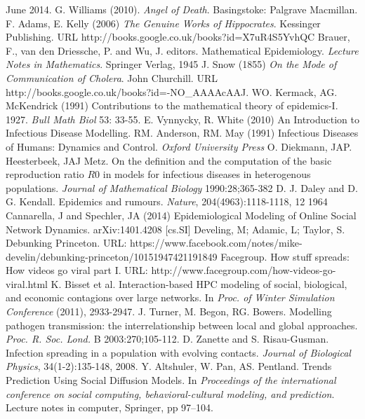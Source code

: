 \documentclass[11pt, a4paper, oneside,titlepage]{article}
\begin{document}
\begin{thebibliography}{1}
          June 2014.
	G. Williams (2010). \emph{Angel of Death}. Basingstoke: Palgrave Macmillan.
	F. Adams, E. Kelly (2006) \emph{The Genuine Works of Hippocrates}. Kessinger Publishing. URL http://books.google.co.uk/books?id=X7uR4S5YvhQC
	 Brauer, F., van den Driessche, P. and Wu, J. editors.  Mathematical Epidemiology. \emph{Lecture Notes in Mathematics}. Springer Verlag, 1945 
	J. Snow (1855) \emph{On the Mode of Communication of Cholera}. John Churchill. URL http://books.google.co.uk/books?id=-NO\_AAAAcAAJ.
	WO. Kermack, AG. McKendrick (1991) Contributions to the mathematical theory of epidemics-I. 1927. \emph{Bull Math Biol} 53: 33-55.
	E. Vynnycky, R. White (2010) An Introduction to Infectious Disease Modelling.
	RM. Anderson, RM. May (1991) Infectious Diseases of Humans: Dynamics and Control. \emph{Oxford University Press}
	O. Diekmann, JAP. Heesterbeek, JAJ Metz. On the definition and the computation of the basic reproduction ratio $R0$ in models for infectious diseases in heterogenous populations. \emph{Journal of Mathematical Biology} 1990:28;365-382
	D. J. Daley and D. G. Kendall. Epidemics and rumours. \emph{Nature}, 204(4963):1118-1118, 12 1964
	Cannarella, J and Spechler, JA (2014) Epidemiological Modeling of Online Social Network Dynamics. arXiv:1401.4208 [cs.SI]
Develing, M; Adamic, L; Taylor, S. Debunking Princeton. URL: https://www.facebook.com/notes/mike-develin/debunking-princeton/10151947421191849
	Facegroup. How stuff spreads: How videos go viral part I. URL: http://www.facegroup.com/how-videos-go-viral.html	
	K. Bisset et al. Interaction-based HPC modeling of social, biological, and economic contagions over large networks. In \emph{Proc. of Winter Simulation Conference} (2011), 2933-2947.
	J. Turner, M. Begon, RG. Bowers. Modelling pathogen transmission: the interrelationship between local and global approaches. \emph{Proc. R. Soc. Lond.} B 2003:270;105-112.
	D. Zanette and S. Risau-Gusman. Infection spreading in a population with evolving contacts. \emph{Journal of Biological Physics}, 34(1-2):135-148, 2008.
	Y. Altshuler, W. Pan, AS. Pentland. Trends Prediction Using Social Diffusion Models. In \emph{Proceedings of the international conference on social computing, behavioral-cultural modeling, and prediction}. Lecture notes in computer, Springer, pp 97–104.

\end{thebibliography}
\end{document}
